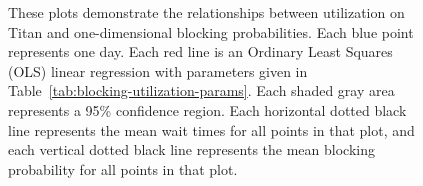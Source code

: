 \begin{figure}
  \vspace{1em}
  \caption{These plots demonstrate the relationships between utilization on
Titan and one-dimensional blocking probabilities. Each blue point represents
one day. Each red line is an Ordinary Least Squares (OLS) linear regression
with parameters given in Table~\ref{tab:blocking-utilization-params}. Each
shaded gray area represents a 95\% confidence region. Each horizontal dotted
black line represents the mean wait times for all points in that plot, and each
vertical dotted black line represents the mean blocking probability for all
points in that plot.}
\end{figure}

